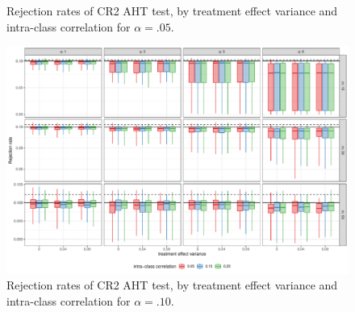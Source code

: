 \documentclass[12pt]{article}
\begin{document}
\begin{landscape}
\begin{figure}[p]
{}

\caption{Rejection rates of CR2 AHT test, by treatment effect variance and intra-class correlation for $\alpha = .05$.}\label{fig:misspecification_05}
\end{figure}

\begin{figure}[p]

{\centering \includegraphics[width=\linewidth]{CR_fig/misspecification_10-1} 

}

\caption{Rejection rates of CR2 AHT test, by treatment effect variance and intra-class correlation for $\alpha = .10$.}\label{fig:misspecification_10}
\end{figure}

\end{landscape}



\end{document}

